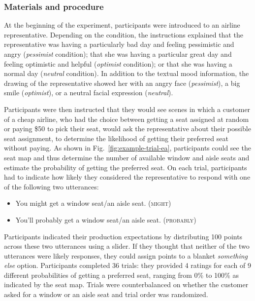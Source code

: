 
\subsubsection{Materials and procedure}
At the beginning of the experiment, participants were introduced to an airline representative. Depending on the condition, the instructions explained that the representative was having a particularly bad day and feeling pessimistic and angry (\textit{pessimist} condition); that she was having a particular great day and feeling optimistic and helpful (\textit{optimist} condition); or that she was having a normal day (\textit{neutral} condition). In addition to the textual mood information, the drawing of the representative  showed her with an angry face (\textit{pessimist}), a big smile (\textit{optimist}), or a neutral facial expression (\textit{neutral}).

Participants were then instructed that they would see scenes in which a customer of a cheap airline, who had the choice between getting a seat assigned at random or paying \$50 to pick their seat, would ask the representative about their possible seat assignment, to determine the likelihood of getting their preferred seat without paying. As shown in Fig.~\ref{fig:example-trial-ea}, participants could see the seat map and thus determine the number of available window and aisle seats and estimate the probability of getting the preferred seat. On each trial, participants had to indicate how likely they considered the representative to respond with one of the following two  utterances:

\begin{itemize}
    \item You might get a window seat/an aisle seat. (\textsc{might})
    \item You'll probably get a window seat/an aisle seat. (\textsc{probably})
\end{itemize}

Participants indicated their production expectations by distributing 100 points across these two utterances using a slider. If they thought that neither of the two utterances were likely responses, they could assign points to a blanket \textit{something else} option. Participants completed 36 trials: they provided  4 ratings for each of 9 different probabilities of getting a preferred seat, ranging from 0\% to 100\% as indicated by the seat map. Trials were counterbalanced on whether the customer asked for a window or an aisle seat and trial order was randomized.


